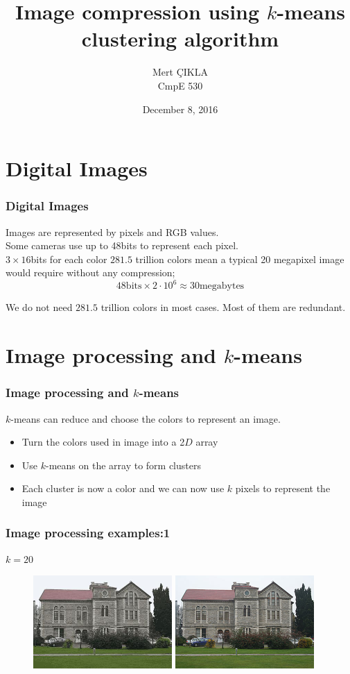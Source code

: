 \documentclass{beamer}
\title[k means]{Image compression using $k$-means clustering algorithm} %
\author{Mert ÇIKLA\\CmpE 530} %
\institute[Boun] %
{
Boğaziçi University \\ %
\medskip
}
\date{December 8, 2016} %
\begin{document}
\begin{frame}
\titlepage %

\end{frame}


\section{Digital Images}
\begin{frame}
\frametitle{Digital Images}
Images are represented by pixels and RGB values.\\

Some cameras use up to 48bits to represent each pixel.\\ 
$3 \times 16$bits for each color $281.5$ trillion colors mean
a typical 20 megapixel image would require without any compression;
$$48\text{bits} \times 2\cdot 10^6 \approx 30 \text{megabytes}$$

We do not need $281.5$ trillion colors in most cases. Most of them are redundant.\\

\end{frame}
\section{Image processing and $k$-means}
\begin{frame}
\frametitle{Image processing and $k$-means}
$k$-means can reduce and choose the colors to represent an image.
\begin{itemize}
\item Turn the colors used in image into a 2$D$ array
\item Use $k$-means on the array to form clusters
\item Each cluster is now a color and we can now use $k$ pixels to represent the image 
\end{itemize}
\end{frame}



\begin{frame}
\frametitle{Image processing examples:1}
$k=20$
\begin{figure}
\includegraphics[width=150pt]{boun_compressed.jpg}
\quad 
\includegraphics[width=150pt]{boun_4.jpg}
\end{figure}
\end{frame}
\end{document}
